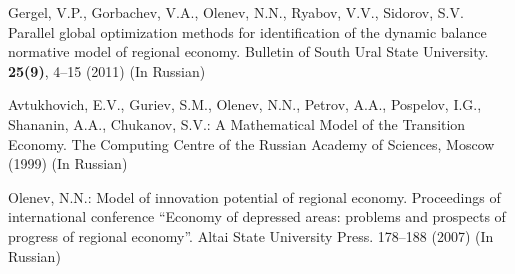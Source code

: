 \begin{thebibliography}{99.}
Gergel, V.P., Gorbachev, V.A., Olenev, N.N., Ryabov, V.V., Sidorov, S.V. Parallel global optimization methods for identification of the dynamic balance normative model of regional economy. Bulletin of South Ural State University. \textbf{25(9)}, 4--15 (2011) (In Russian)

Avtukhovich, E.V., Guriev, S.M., Olenev, N.N., Petrov, A.A., Pospelov, I.G., Shananin, A.A., Chukanov, S.V.: A Mathematical Model of the Transition Economy. The Computing Centre of the Russian Academy of Sciences, Moscow (1999) (In Russian)

Olenev, N.N.: Model of innovation potential of regional economy. Proceedings of international conference ``Economy of depressed areas: problems and prospects of progress of regional economy''. Altai State University Press. 178--188 (2007) (In Russian)

\end{thebibliography}

%
